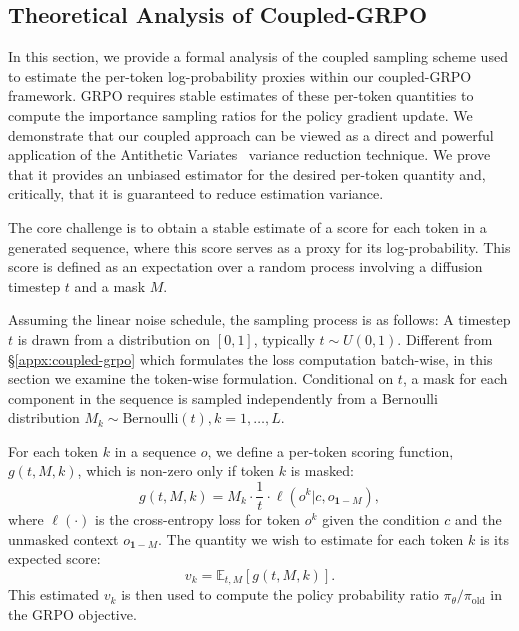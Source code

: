 {
  \subsection{Theoretical Analysis of Coupled-GRPO}
  \label{appx:coupled-grpo-theory}

  In this section, we provide a formal analysis of the coupled sampling scheme used to estimate the per-token log-probability proxies within our coupled-GRPO framework.
  GRPO requires stable estimates of these per-token quantities to compute the importance sampling ratios for the policy gradient update.
  We demonstrate that our coupled approach can be viewed as a direct and powerful application of the Antithetic Variates~\citep{hammersley1956new,hammersley1956general} variance reduction technique.
  We prove that it provides an unbiased estimator for the desired per-token quantity and, critically, that it is guaranteed to reduce estimation variance.
  
  
  The core challenge is to obtain a stable estimate of a score for each token in a generated sequence, where this score serves as a proxy for its log-probability. This score is defined as an expectation over a random process involving a diffusion timestep $t$ and a mask $M$.
  
  Assuming the linear noise schedule, the sampling process is as follows:
  A timestep $t$ is drawn from a distribution on $[0, 1]$, typically $t \sim U(0, 1)$.
  Different from \S\ref{appx:coupled-grpo} which formulates the loss computation batch-wise, in this section we examine the token-wise formulation.
  Conditional on $t$, a mask for each component in the sequence is sampled independently from a Bernoulli distribution $M_k \sim \text{Bernoulli}(t), k = 1, \dots, L$.

  For each token $k$ in a sequence $o$, we define a {per-token scoring function}, $g(t, M, k)$, which is non-zero only if token $k$ is masked:
  \begin{equation}
      g(t, M, k) = M_k \cdot \frac{1}{t} \cdot \ell(o^k | c, o_{\mathbf{1}-M}),
  \end{equation}
  where $\ell(\cdot)$ is the cross-entropy loss for token $o^k$ given the condition $c$ and the unmasked context $o_{\mathbf{1}-M}$. The quantity we wish to estimate for each token $k$ is its expected score:
  \begin{equation}
      v_k = \mathbb{E}_{t, M} [g(t, M, k)].
  \end{equation}
  This estimated $v_k$ is then used to compute the policy probability ratio $\pi_\theta/\pi_{\text{old}}$ in the GRPO objective.
  
}
